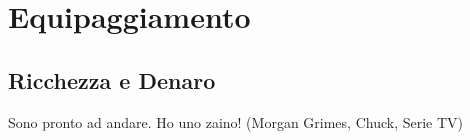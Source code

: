 \section{Equipaggiamento}\hypertarget{equipaggiamento}{}\label{equipaggiamento}

\subsection{Ricchezza e Denaro}
\begin{changemargin}{0.3cm}{0.3cm}\begin{enfasi}{\begin{center}Sono pronto ad andare. Ho uno zaino! (Morgan Grimes, Chuck, Serie TV)\end{center}
}\end{enfasi}\end{changemargin}

